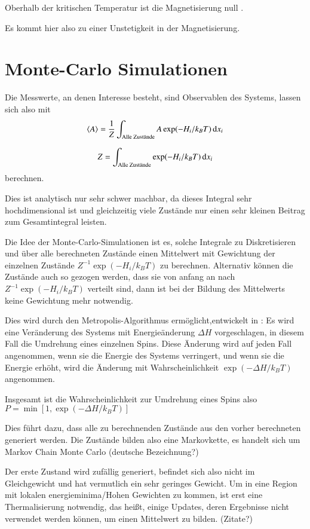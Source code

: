 \documentclass{scrreprt}
\begin{document}
	Oberhalb der kritischen Temperatur ist die Magnetisierung null \cite{MontrollMagnetization}.
	
	Es kommt hier also zu einer Unstetigkeit in der Magnetisierung.
	
	\section{Monte-Carlo Simulationen}
	Die Messwerte, an denen Interesse besteht, sind Observablen des Systems, lassen sich also mit \[
	\langle A \rangle=\frac{1}{Z}\int_{\text{Alle Zustände}}A \exp(-H_i/k_BT)\dif x_i\]
	
	\[
	Z=\int_{\text{Alle Zustände}} \exp(-H_i/k_BT) \dif x_i
	\]
	berechnen.
	
	Dies ist analytisch nur sehr schwer machbar, da dieses Integral sehr hochdimensional ist und gleichzeitig viele Zustände nur einen sehr kleinen Beitrag zum Gesamtintegral leisten.
	
	Die Idee der Monte-Carlo-Simulationen ist es, solche Integrale zu Diskretisieren
	und über alle berechneten Zustände einen Mittelwert mit Gewichtung der einzelnen Zustände $Z^{-1} \exp(-H_i/k_BT)$ zu berechnen. Alternativ können die Zustände auch so gezogen werden, dass sie von anfang an nach $Z^{-1} \exp(-H_i/k_BT)$ verteilt sind, dann ist bei der Bildung des Mittelwerts keine Gewichtung mehr notwendig. %
	
	Dies wird durch den Metropolis-Algorithmus ermöglicht,entwickelt in \cite{metropolisupdate}:
	Es wird eine Veränderung des Systems mit Energieänderung $\Delta H$ vorgeschlagen, in diesem Fall die Umdrehung eines einzelnen Spins. Diese Änderung wird auf jeden Fall angenommen, wenn sie die Energie des Systems verringert, und wenn sie die Energie erhöht, wird die Änderung mit Wahrscheinlichkeit $\exp(-\Delta H/k_BT)$ angenommen.
	
	Insgesamt ist die Wahrscheinlichkeit zur Umdrehung eines Spins also $P=\min \left[1, \exp(-\Delta H/k_BT)\right]$
	
	Dies führt dazu, dass alle zu berechnenden Zustände aus den vorher berechneten generiert werden. Die Zustände bilden also eine Markovkette, es handelt sich um Markov Chain Monte Carlo (deutsche Bezeichnung?)
	
	Der erste Zustand wird zufällig generiert, befindet sich also nicht im Gleichgewicht und hat vermutlich ein sehr geringes Gewicht. Um in eine Region mit lokalen energieminima/Hohen Gewichten zu kommen, ist erst eine Thermalisierung notwendig, das heißt, einige Updates, deren Ergebnisse nicht verwendet werden können, um einen Mittelwert zu bilden. (Zitate?)
	
\end{document}
